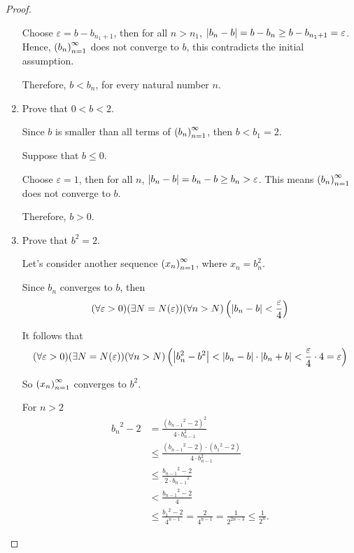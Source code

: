\begin{proof}
\begin{enumerate}[label={\textbf{Step \arabic*.}},start=4,itemindent=1cm]
              Choose $\varepsilon = b - b_{n_{1} + 1}$, then for all $n > n_{1}$, $\left\vert{b_{n} - b}\right\vert = b - b_{n} \ge b - b_{n_{1} + 1} = \varepsilon$. Hence, ${\left({b_{n}}\right)}^{\infty}_{n=1}$ does not converge to $b$, this contradicts the initial assumption.

              Therefore, $b < b_{n}$, for every natural number $n$.
        \item Prove that $0 < b < 2$.

              Since $b$ is smaller than all terms of ${\left({b_{n}}\right)}^{\infty}_{n=1}$, then $b < b_{1} = 2$.

              Suppose that $b\le 0$.

              Choose $\varepsilon = 1$, then for all $n$, $\left\vert{b_{n} - b}\right\vert = b_{n} - b \ge b_{n} > \varepsilon$. This means ${\left({b_{n}}\right)}^{\infty}_{n=1}$ does not converge to $b$.

              Therefore, $b > 0$.
        \item Prove that ${b}^{2} = 2$.

              Let's consider another sequence ${\left({x_{n}}\right)}^{\infty}_{n=1}$, where $x_{n} = {b^{2}_{n}}$.

              Since $b_{n}$ converges to $b$, then
              \[
                  (\forall\varepsilon > 0)(\exists N=N(\varepsilon))(\forall n > N)\left(\left\vert{b_{n} - b}\right\vert < \frac{\varepsilon}{4}\right)
              \]

              It follows that
              \[
                  (\forall\varepsilon > 0)(\exists N=N(\varepsilon))(\forall n > N)\left(\left\vert{b^{2}_{n} - b^{2}}\right\vert < \left\vert{b_{n} - b}\right\vert\cdot\left\vert{b_{n} + b}\right\vert < \frac{\varepsilon}{4}\cdot 4 = \varepsilon \right)
              \]

              So ${\left({x_{n}}\right)}^{\infty}_{n=1}$ converges to $b^{2}$.

              For $n > 2$
              \begin{align*}
                  {b_{n}}^{2} - 2 & = \frac{{\left( {b_{n-1}}^{2} - 2 \right)}^{2}}{4\cdot b^{2}_{n-1}}                               \\
                                  & \le \frac{({b_{n-1}}^{2} - 2)\cdot ({b_{1}}^{2} - 2)}{4\cdot b^{2}_{n-1}}                         \\
                                  & \le \frac{{b_{n-1}}^{2} - 2}{2\cdot {b_{n-1}}^{2}}                                                \\
                                  & < \frac{{b_{n-1}}^{2} - 2}{4}                                                                     \\
                                  & \le \frac{{b_{1}}^{2} - 2}{4^{n-1}} = \frac{2}{4^{n-1}} = \frac{1}{2^{2n-3}} \le \frac{1}{2^{n}}.
              \end{align*}


\end{enumerate}
\end{proof}
